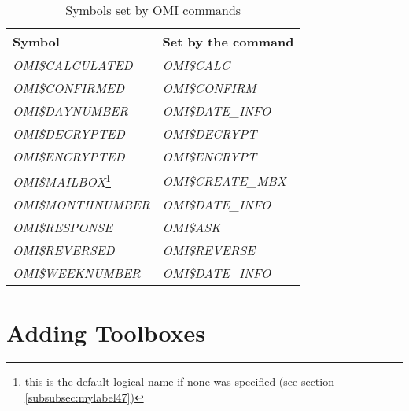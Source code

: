 \documentclass[a4paper]{book}
\begin{document}
\begin{table}[h!tb]
\begin{minipage}[h!tb]{\textwidth}
\begin{tabular}{ll} \hline
\textbf{Symbol} & \textbf{Set by the command}\\ \hline
\textsl{OMI{\$}CALCULATED}\index{OMI{\$}CALCULATED}\index{OMI symbols!global symbols!OMI{\$}CALCULATED} & \textsl{OMI{\$}CALC} \\
\textsl{OMI{\$}CONFIRMED}\index{OMI{\$}CONFIRMED}\index{OMI symbols!global symbols!OMI{\$}CONFIRMED} & \textsl{OMI{\$}CONFIRM} \\
\textsl{OMI{\$}DAYNUMBER}\index{OMI{\$}DAYNUMBER}\index{OMI symbols!global symbols!OMI{\$}DAYNUMBER} & \textsl{OMI{\$}DATE{\_}INFO} \\
\textsl{OMI{\$}DECRYPTED}\index{OMI{\$}DECRYPTED}\index{OMI symbols!global symbols!OMI{\$}DECRYPTED} & \textsl{OMI{\$}DECRYPT} \\
\textsl{OMI{\$}ENCRYPTED}\index{OMI{\$}ENCRYPTED}\index{OMI symbols!global symbols!OMI{\$}ENCRYPTED} & \textsl{OMI{\$}ENCRYPT} \\
\textsl{OMI{\$}MAILBOX}\footnote{ this is the default logical name if none was specified (see section \ref{subsubsec:mylabel47})}\index{OMI{\$}MAILBOX}\index{OMI symbols!global symbols!OMI{\$}MAILBOX} & \textsl{OMI{\$}CREATE{\_}MBX} \\
\textsl{OMI{\$}MONTHNUMBER}\index{OMI{\$}MONTHNUMBER}\index{OMI symbols!global symbols!OMI{\$}MONTHNUMBER} & \textsl{OMI{\$}DATE{\_}INFO} \\
\textsl{OMI{\$}RESPONSE}\index{OMI{\$}RESPONSE}\index{OMI symbols!global symbols!OMI{\$}RESPONSE} & \textsl{OMI{\$}ASK} \\
\textsl{OMI{\$}REVERSED}\index{OMI{\$}REVERSED}\index{OMI symbols!global symbols!OMI{\$}REVERSED} & \textsl{OMI{\$}REVERSE} \\
\textsl{OMI{\$}WEEKNUMBER}\index{OMI{\$}WEEKNUMBER}\index{OMI symbols!global symbols!OMI{\$}WEEKNUMBER} & \textsl{OMI{\$}DATE{\_}INFO} \\
\hline
\end{tabular}
\caption{Symbols set by OMI commands}\label{tab:globsymbols}
\end{minipage}
\end{table}

\chapter{Adding Toolboxes}
\label{sec:adding}
\end{document}
